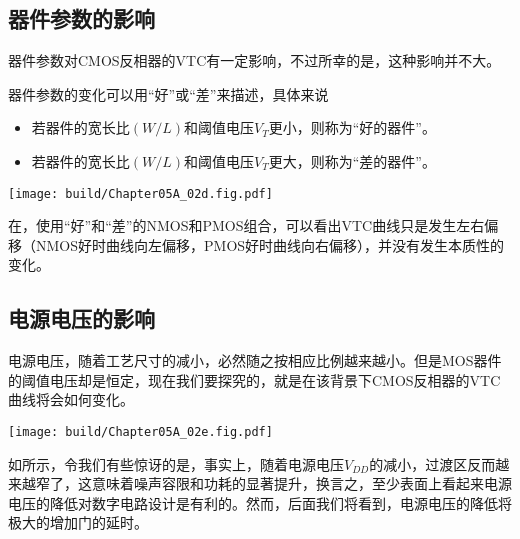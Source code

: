 \subsection{器件参数的影响}
器件参数对CMOS反相器的VTC有一定影响，不过所幸的是，这种影响并不大。\goodbreak

器件参数的变化可以用“好”或“差”来描述，具体来说
\begin{itemize}
    \item 若器件的宽长比$(W/L)$和阈值电压$V_{T}$更小，则称为“好的器件”。
    \item 若器件的宽长比$(W/L)$和阈值电压$V_{T}$更大，则称为“差的器件”。
\end{itemize}
\begin{Figure}[器件参数的影响]
    \texttt{[image: build/Chapter05A\_02d.fig.pdf]}\hspace{0.7cm}
\end{Figure}
在，使用“好”和“差”的NMOS和PMOS组合，可以看出VTC曲线只是发生左右偏移（NMOS好时曲线向左偏移，PMOS好时曲线向右偏移），并没有发生本质性的变化。

\subsection{电源电压的影响}
电源电压，随着工艺尺寸的减小，必然随之按相应比例越来越小。但是MOS器件的阈值电压却是恒定，现在我们要探究的，就是在该背景下CMOS反相器的VTC曲线将会如何变化。
\begin{Figure}[器件参数的影响]
    \texttt{[image: build/Chapter05A\_02e.fig.pdf]}\hspace{0.7cm}
\end{Figure}
如所示，令我们有些惊讶的是，事实上，随着电源电压$V_{DD}$的减小，过渡区反而越来越窄了，这意味着噪声容限和功耗的显著提升，换言之，至少表面上看起来电源电压的降低对数字电路设计是有利的。然而，后面我们将看到，电源电压的降低将极大的增加门的延时。